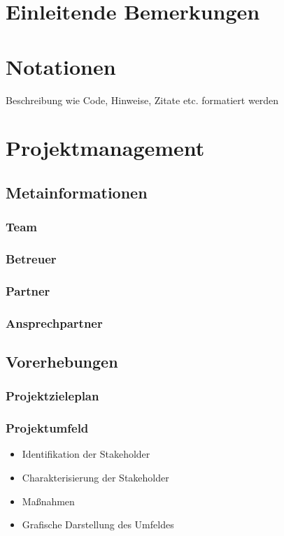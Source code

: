 \def \currentAuthor {Gabi Sorglos} %

\chapter*{Einleitende Bemerkungen}

\chapter*{Notationen}
Beschreibung wie Code, Hinweise, Zitate etc. formatiert werden  


\chapter{Projektmanagement}
\section{Metainformationen}
\subsection{Team}
\subsection{Betreuer}
\subsection{Partner}
\subsection{Ansprechpartner}
\section{Vorerhebungen}
\subsection{Projektzieleplan}


\newpage
\subsection{Projektumfeld}
\begin{itemize}
	\item Identifikation der Stakeholder
	\item Charakterisierung der Stakeholder
	\item Maßnahmen
	\item Grafische Darstellung des Umfeldes
\end{itemize}
